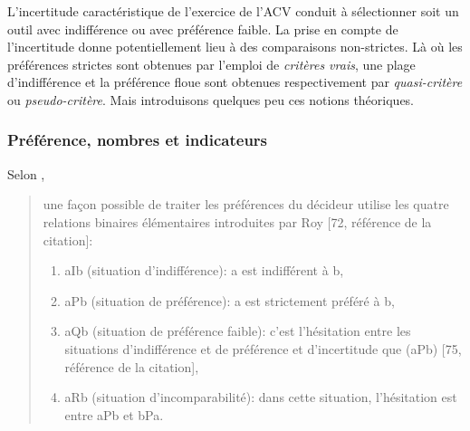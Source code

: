 L'incertitude caractéristique de l'exercice de l'\gls{ACV} conduit à sélectionner soit un outil avec indifférence ou avec préférence faible.
La prise en compte de l'incertitude donne potentiellement lieu à des comparaisons non-strictes.
Là où les préférences strictes sont obtenues par l'emploi de \textit{critères vrais}, une plage d'indifférence et la préférence floue sont obtenues respectivement par \textit{quasi-critère} ou \textit{pseudo-critère}.
Mais introduisons quelques peu ces notions théoriques.

\subsubsection{Préférence, nombres et indicateurs}

Selon \citeauthor{guitouni_tentative_1998},
\blockcquote[traduction]{guitouni_tentative_1998}{
une façon possible de traiter les préférences du décideur utilise les quatre relations binaires élémentaires introduites par Roy [72, référence de la citation]:
\begin{enumerate}
\item aIb (situation d'indifférence): a est indifférent à b,
\item aPb (situation de préférence): a est strictement préféré à b,
\item aQb (situation de préférence faible): c'est l'hésitation entre les situations d'indifférence et de préférence et d'incertitude que (aPb) [75, référence de la citation],
\item aRb (situation d'incomparabilité): dans cette situation, l'hésitation est entre aPb et bPa.
\end{enumerate}
}


